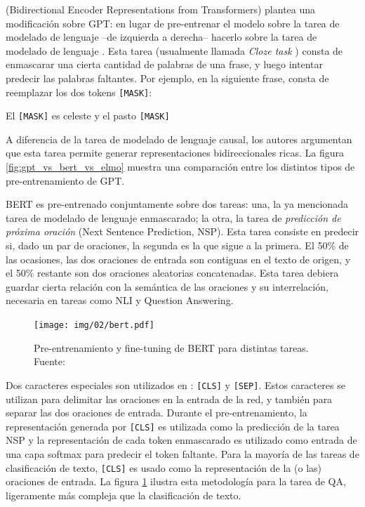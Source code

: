 \bert{} \cite{devlin2018bert} (Bidirectional Encoder Representations from Transformers) plantea una modificación sobre GPT: en lugar de pre-entrenar el modelo sobre la tarea de modelado de lenguaje  --de izquierda a derecha-- hacerlo sobre la tarea de modelado de lenguaje . Esta tarea (usualmente llamada \emph{Cloze task} \cite{taylor1953cloze}) consta de enmascarar una cierta cantidad de palabras de una frase, y luego intentar predecir las palabras faltantes. Por ejemplo, en la siguiente frase, consta de reemplazar los dos tokens \verb|[MASK]|:

\begin{center}
    El \verb|[MASK]| es celeste y el pasto \verb|[MASK]|
\end{center}


A diferencia de la tarea de modelado de lenguaje causal, los autores argumentan que esta tarea permite generar representaciones bidireccionales ricas. La figura \ref{fig:gpt_vs_bert_vs_elmo} muestra una comparación entre los distintos tipos de pre-entrenamiento de GPT.

BERT es pre-entrenado conjuntamente sobre dos tareas: una, la ya mencionada tarea de modelado de lenguaje enmascarado; la otra, la tarea de \emph{predicción de próxima oración} (Next Sentence Prediction, NSP). Esta tarea consiste en predecir si, dado un par de oraciones, la segunda es la que sigue a la primera. El 50\% de las ocasiones, las dos oraciones de entrada son contiguas en el texto de origen, y el 50\% restante son dos oraciones aleatorias concatenadas. Esta tarea debiera guardar cierta relación con la semántica de las oraciones y su interrelación, necesaria en tareas como NLI y Question Answering.

\newcommand{\clstok}[0]{\texttt{[CLS]}}
\newcommand{\septok}[0]{\texttt{[SEP]}}

\begin{figure}[t]
    \centering
    \texttt{[image: img/02/bert.pdf]}
    \caption{Pre-entrenamiento y fine-tuning de BERT para distintas tareas. Fuente: \citet{devlin2018bert}}
    \label{fig:bert_pretraining_and_finetuning}
\end{figure}

Dos caracteres especiales son utilizados en \bert{}: \clstok{} y \septok{}. Estos caracteres se utilizan para delimitar las oraciones en la entrada de la red, y también para separar las dos oraciones de entrada. Durante el pre-entrenamiento, la representación generada por \clstok{} es utilizada como la predicción de la tarea NSP y la representación de cada token enmascarado es utilizado como entrada de una capa softmax para predecir el token faltante. Para la mayoría de las tareas de clasificación de texto, \clstok{} es usado como la representación de la (o las) oraciones de entrada. La figura \ref{fig:bert_pretraining_and_finetuning} ilustra esta metodología para la tarea de QA, ligeramente más compleja que la clasificación de texto.

